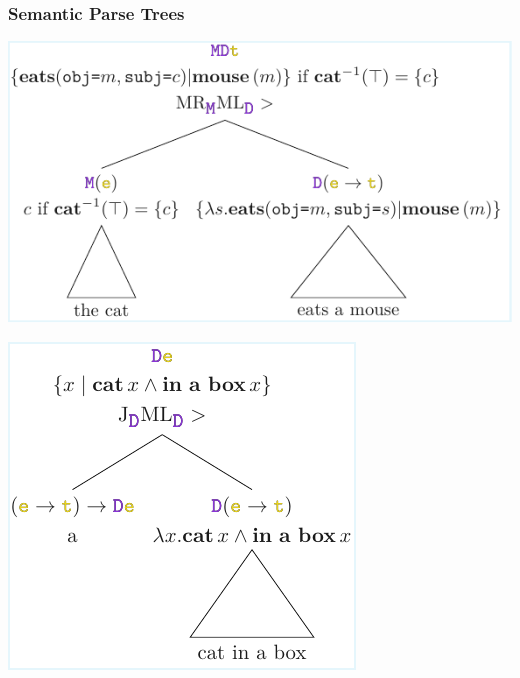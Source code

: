 \documentclass[math, english, info]{beamercours}
\begin{document}
\begin{frame}
	\frametitle{Semantic Parse Trees}
	\begin{center}
		\includegraphics{aux/figures/parse-tree-2.pdf}
	\end{center}

	\centering
	\includegraphics{aux/figures/parse-tree-1.pdf}


\end{frame}
\end{document}
